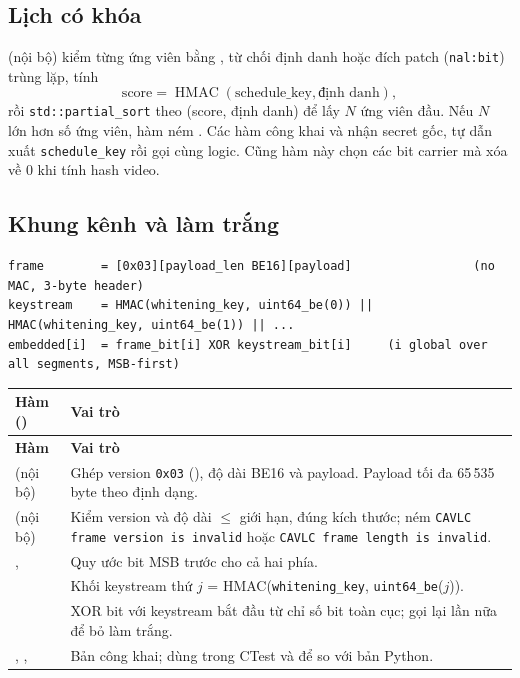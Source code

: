 \documentclass[11pt,a4paper]{article}
\begin{document}
\subsection{Lịch có khóa}

 (nội bộ) kiểm từng ứng viên bằng
, từ chối định danh hoặc đích patch
(\texttt{nal:bit}) trùng lặp, tính
\[
  \text{score} = \operatorname{HMAC}(\text{schedule\_key}, \text{định danh}),
\]
rồi
\texttt{std::partial\_sort} theo (score, định danh) để lấy $N$ ứng viên đầu. Nếu
$N$ lớn hơn số ứng viên, hàm ném .
Các hàm công khai  và
 nhận secret gốc, tự dẫn xuất
\texttt{schedule\_key} rồi gọi cùng logic. Cũng hàm này chọn các bit carrier mà
 xóa về 0 khi tính hash video.

\subsection{Khung kênh và làm trắng}

\begin{lstlisting}[numbers=none]
frame        = [0x03][payload_len BE16][payload]                 (no MAC, 3-byte header)
keystream    = HMAC(whitening_key, uint64_be(0)) || HMAC(whitening_key, uint64_be(1)) || ...
embedded[i]  = frame_bit[i] XOR keystream_bit[i]     (i global over all segments, MSB-first)
\end{lstlisting}

\begin{longtable}{P{.33\textwidth}P{.58\textwidth}}
\toprule\textbf{Hàm ()} & \textbf{Vai trò} \\
\midrule\endfirsthead
\toprule\textbf{Hàm} & \textbf{Vai trò} \\
\midrule\endhead
{} (nội bộ) & Ghép version \texttt{0x03} (), độ dài BE16 và payload. Payload tối đa 65\,535 byte theo định dạng. \\
 (nội bộ) & Kiểm version và độ dài $\le$ giới hạn, đúng kích thước; ném \texttt{CAVLC frame version is invalid} hoặc \texttt{CAVLC frame length is invalid}. \\
,  & Quy ước bit MSB trước cho cả hai phía. \\
 & Khối keystream thứ $j$ = HMAC(\texttt{whitening\_key}, \texttt{uint64\_be}($j$)). \\
 & XOR bit với keystream bắt đầu từ chỉ số bit toàn cục; gọi lại lần nữa để bỏ làm trắng. \\
, ,  & Bản công khai; dùng trong CTest và để so với bản Python. \\
\bottomrule\end{longtable}
\end{document}
